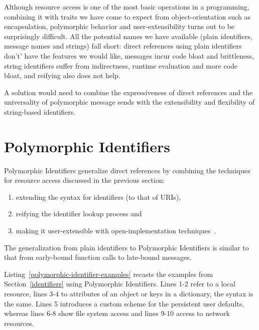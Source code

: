 \documentclass[preprint,authoryear]{llncs}
\begin{document}
Although resource access is one of the most basic operations in a programming, combining it
with traits we have come to expect from object-orientation such as encapsulation, polymorphic
behavior and user-extensibility turns out to be surprisingly difficult.   All the potential names
we have available (plain identifiers, message names and strings) fall short:  direct references
using plain identifiers don't' have the features we would like, messages incur code bloat
and brittleness, string identifiers suffer from indirectness, runtime evaluation and more
code bloat, and reifying also does not help.

A solution would need to combine the expressiveness of direct references and the universality
of polymorphic message sends with the extensibility and flexibility of string-based identifiers.



\section{Polymorphic Identifiers}
\label{polymorphic-identifiers}

Polymorphic Identifiers generalize direct references
by combining the techniques for resource access discussed in the previous 
section:
\begin{enumerate}
\item extending the syntax for identifiers (to that of URIs),
\item reifying the identifier lookup process and
\item making it user-extensible with open-implementation techniques~\cite{OpenImplementations}.
\end{enumerate}

The generalization from plain identifiers to Polymorphic Identifiers is similar to that from early-bound
function calls to late-bound messages.

Listing~\ref{polymorphic-identifier-examples} recasts the examples from Section~\ref{identifiers} using
Polymorphic Identifiers.  Lines 1-2 refer to a local resource, lines 3-4 to attributes of an object or 
keys in a dictionary, the syntax is the same.  Lines 5 introduces a custom scheme for the persistent
user defaults, whereas lines 6-8 show file system access and lines 9-10 access to network resources.
\end{document}
